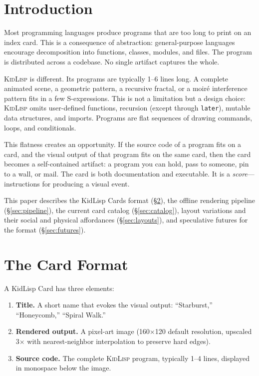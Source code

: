 \documentclass[10pt,letterpaper,twocolumn]{article}
\newcommand{\kidlisp}{\textsc{KidLisp}}
\begin{document}

\section{Introduction}

Most programming languages produce programs that are too long to print on an index card. This is a consequence of abstraction: general-purpose languages encourage decomposition into functions, classes, modules, and files. The program is distributed across a codebase. No single artifact captures the whole.

\kidlisp{} is different. Its programs are typically 1--6 lines long. A complete animated scene, a geometric pattern, a recursive fractal, or a moiré interference pattern fits in a few S-expressions. This is not a limitation but a design choice: \kidlisp{} omits user-defined functions, recursion (except through \texttt{later}), mutable data structures, and imports. Programs are flat sequences of drawing commands, loops, and conditionals.

This flatness creates an opportunity. If the source code of a program fits on a card, and the visual output of that program fits on the same card, then the card becomes a self-contained artifact: a program you can hold, pass to someone, pin to a wall, or mail. The card is both documentation and executable. It is a \emph{score}---instructions for producing a visual event.

This paper describes the KidLisp Cards format (\S\ref{sec:format}), the offline rendering pipeline (\S\ref{sec:pipeline}), the current card catalog (\S\ref{sec:catalog}), layout variations and their social and physical affordances (\S\ref{sec:layouts}), and speculative futures for the format (\S\ref{sec:futures}).


\section{The Card Format}
\label{sec:format}

A KidLisp Card has three elements:

\begin{enumerate}
  \item \textbf{Title.} A short name that evokes the visual output: ``Starburst,'' ``Honeycomb,'' ``Spiral Walk.''
  \item \textbf{Rendered output.} A pixel-art image (160$\times$120 default resolution, upscaled 3$\times$ with nearest-neighbor interpolation to preserve hard edges).
  \item \textbf{Source code.} The complete \kidlisp{} program, typically 1--4 lines, displayed in monospace below the image.
\end{enumerate}
\end{document}
